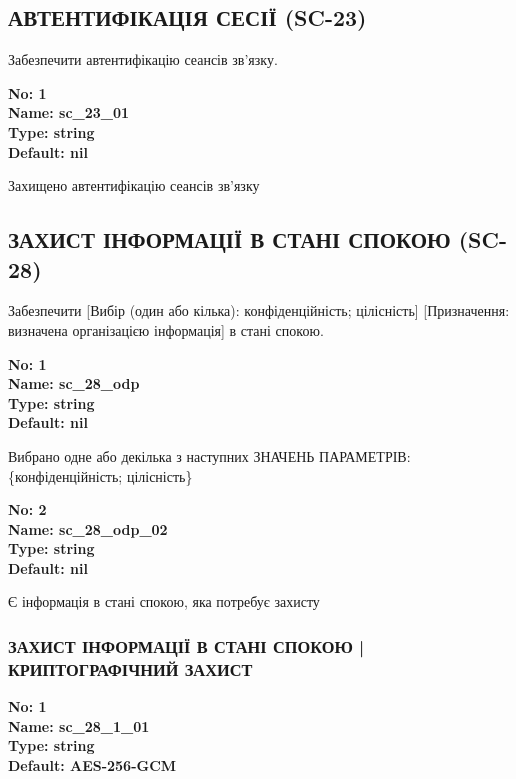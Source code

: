 \documentclass{article}
\begin{document}
\subsection{АВТЕНТИФІКАЦІЯ СЕСІЇ (SC-23)}
Забезпечити автентифікацію сеансів зв'язку.

\vspace{10pt}
{\footnotesize\bfseries
No: 1\\
Name: sc\_\allowbreak{}23\_\allowbreak{}01\\
Type: string\\
Default: nil
}

{\footnotesize Захищено автентифікацію сеансів зв'язку}




\subsection{ЗАХИСТ ІНФОРМАЦІЇ В СТАНІ СПОКОЮ (SC-28)}
Забезпечити [Вибір (один або кілька): конфіденційність; цілісність] [Призначення: визначена організацією інформація] в стані спокою.

\vspace{10pt}
{\footnotesize\bfseries
No: 1\\
Name: sc\_\allowbreak{}28\_\allowbreak{}odp\\
Type: string\\
Default: nil
}

{\footnotesize Вибрано одне або декілька з наступних ЗНАЧЕНЬ ПАРАМЕТРІВ: \{конфіденційність; цілісність\}}


{\footnotesize\bfseries
No: 2\\
Name: sc\_\allowbreak{}28\_\allowbreak{}odp\_\allowbreak{}02\\
Type: string\\
Default: nil
}

{\footnotesize Є інформація в стані спокою, яка потребує захисту}




\subsubsection{ЗАХИСТ ІНФОРМАЦІЇ В СТАНІ СПОКОЮ | КРИПТОГРАФІЧНИЙ ЗАХИСТ}


\vspace{10pt}
{\footnotesize\bfseries
No: 1\\
Name: sc\_\allowbreak{}28\_\allowbreak{}1\_\allowbreak{}01\\
Type: string\\
Default: \textquotedbl{}AES-256-GCM\textquotedbl{}
}
\end{document}
